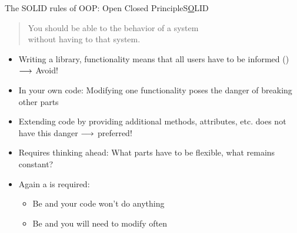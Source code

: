 \begin{frame}{The SOLID rules of OOP: Open Closed Principle}{S\underline  OLID}
	\begin{quote}
		You should be able to  the behavior of a system\\
		without having to  that system.
	\end{quote}

	\begin{itemize}
		\item<2-> Writing a library,  functionality means that all users have to be informed () $\longrightarrow$ Avoid!
		\item<2-> In your own code: Modifying one functionality  poses the danger of breaking other parts 
		\item<3-> Extending code by providing additional methods, attributes, etc. does not have this danger $\longrightarrow$ preferred!
		\item<4-> Requires thinking ahead: What parts have to be flexible, what remains constant?
		\item<4-> Again a  is required:
		\begin{itemize}
			\item Be   and your code won't do anything
			\item Be  and you will need to modify  often
		\end{itemize}
	\end{itemize}
\end{frame}

